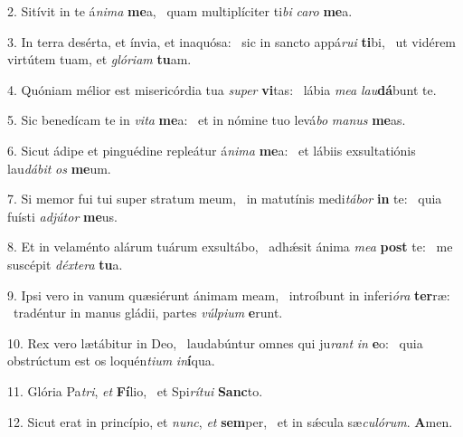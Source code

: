 2. Sitívit in te á\textit{ni}\textit{ma} \textbf{me}a, \ast\  quam multiplíciter ti\textit{bi} \textit{ca}\textit{ro} \textbf{me}a.\

3. In terra desérta, et ínvia, et inaquósa: \dag\  sic in sancto appá\textit{ru}\textit{i} \textbf{ti}bi, \ast\  ut vidérem virtútem tuam, et \textit{gló}\textit{ri}\textit{am} \textbf{tu}am.\

4. Quóniam mélior est misericórdia tua \textit{su}\textit{per} \textbf{vi}tas: \ast\  lábia \textit{me}\textit{a} \textit{lau}\textbf{dá}bunt te.\

5. Sic benedícam te in \textit{vi}\textit{ta} \textbf{me}a: \ast\  et in nómine tuo levá\textit{bo} \textit{ma}\textit{nus} \textbf{me}as.\

6. Sicut ádipe et pinguédine repleátur á\textit{ni}\textit{ma} \textbf{me}a: \ast\  et lábiis exsultatiónis lau\textit{dá}\textit{bit} \textit{os} \textbf{me}um.\

7. Si memor fui tui super stratum meum, \dag\  in matutínis medi\textit{tá}\textit{bor} \textbf{in} te: \ast\  quia fuísti \textit{ad}\textit{jú}\textit{tor} \textbf{me}us.\

8. Et in velaménto alárum tuárum exsultábo, \dag\  adhǽsit ánima \textit{me}\textit{a} \textbf{post} te: \ast\  me suscépit \textit{déx}\textit{te}\textit{ra} \textbf{tu}a.\

9. Ipsi vero in vanum quæsiérunt ánimam meam, \dag\  introíbunt in inferi\textit{ó}\textit{ra} \textbf{ter}ræ: \ast\  tradéntur in manus gládii, partes \textit{vúl}\textit{pi}\textit{um} \textbf{e}runt.\

10. Rex vero lætábitur in Deo, \dag\  laudabúntur omnes qui ju\textit{rant} \textit{in} \textbf{e}o: \ast\  quia obstrúctum est os loquén\textit{ti}\textit{um} \textit{in}\textbf{í}qua.\

11. Glória Pa\textit{tri}, \textit{et} \textbf{Fí}lio, \ast\  et Spi\textit{rí}\textit{tu}\textit{i} \textbf{Sanc}to.\

12. Sicut erat in princípio, et \textit{nunc}, \textit{et} \textbf{sem}per, \ast\  et in sǽcula sæ\textit{cu}\textit{ló}\textit{rum}. \textbf{A}men.\

